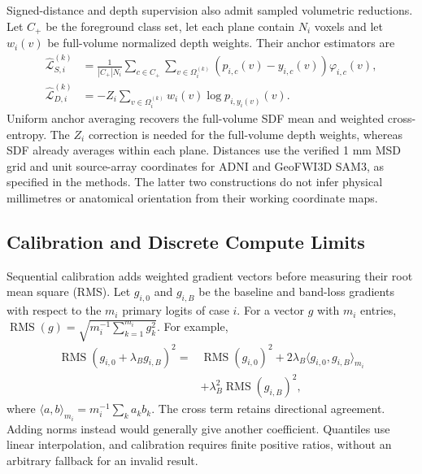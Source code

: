 \documentclass[12pt,a4paper]{article}
\begin{document}
Signed-distance and depth supervision also admit sampled volumetric
reductions. Let $C_+$ be the foreground class set, let each plane
contain $N_i$ voxels and let $w_i(v)$ be full-volume normalized depth
weights. Their anchor estimators are
\begin{align}
\widehat{\mathcal L}_{S,i}^{(k)}
 &=\frac{1}{|C_+|N_i}\sum_{c\in C_+}
   \sum_{v\in\Omega_i^{(k)}}(p_{i,c}(v)-y_{i,c}(v))\varphi_{i,c}(v),
   \label{eq:medsam-sampled-sdf}\\
\widehat{\mathcal L}_{D,i}^{(k)}
 &=-Z_i\sum_{v\in\Omega_i^{(k)}}w_i(v)\log p_{i,y_i(v)}(v).
   \label{eq:medsam-sampled-depth}
\end{align}
Uniform anchor averaging recovers the full-volume SDF mean and weighted
cross-entropy. The $Z_i$ correction is needed for the full-volume depth
weights, whereas SDF already averages within each plane. Distances use the
verified 1 mm MSD grid and unit source-array coordinates for ADNI and
GeoFWI3D SAM3, as specified in the methods. The latter two constructions
do not infer physical millimetres or anatomical orientation from their
working coordinate maps.

\subsection{Calibration and Discrete Compute Limits}

Sequential calibration adds weighted gradient vectors before measuring
their root mean square (RMS). Let $g_{i,0}$ and $g_{i,B}$ be the
baseline and band-loss gradients with respect to the $m_i$ primary
logits of case $i$. For a vector $g$ with $m_i$ entries,
$\operatorname{RMS}(g)=\sqrt{m_i^{-1}\sum_{k=1}^{m_i}g_k^2}$.
For example,
\begin{equation}
\begin{aligned}
\operatorname{RMS}(g_{i,0}+\lambda_B g_{i,B})^2
={}&\operatorname{RMS}(g_{i,0})^2
 +2\lambda_B\langle g_{i,0},g_{i,B}\rangle_{m_i}\\
 &+\lambda_B^2\operatorname{RMS}(g_{i,B})^2,
\end{aligned}
\label{eq:calibration-cross-term}
\end{equation}
where $\langle a,b\rangle_{m_i}=m_i^{-1}\sum_k a_kb_k$.
The cross term retains directional agreement. Adding norms instead
would generally give another coefficient. Quantiles use linear
interpolation, and calibration requires finite positive ratios,
without an arbitrary fallback for an invalid result.
\end{document}
